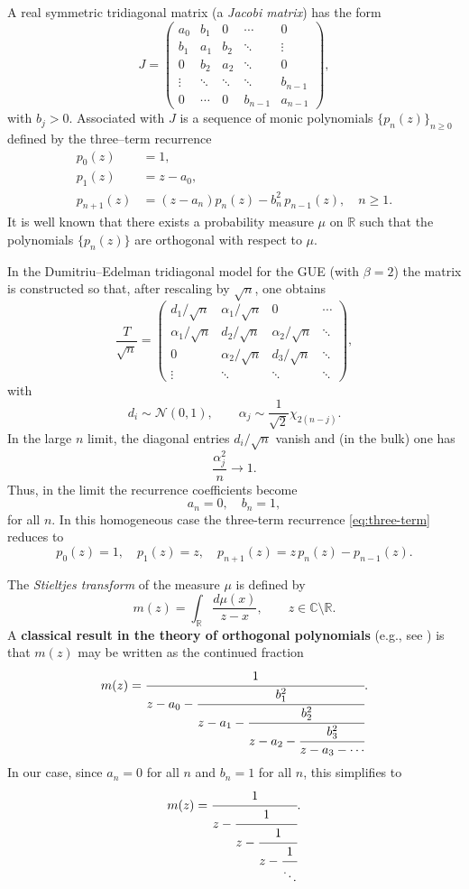 \documentclass[letterpaper,11pt,oneside,reqno]{article}
\numberwithin{equation}{section}
\theoremstyle{definition}
\begin{document}
A real symmetric tridiagonal matrix (a \emph{Jacobi matrix}) has the form
\[
J = \begin{pmatrix}
a_0 & b_1 & 0 & \cdots & 0 \\
b_1 & a_1 & b_2 & \ddots & \vdots \\
0 & b_2 & a_2 & \ddots & 0 \\
\vdots & \ddots & \ddots & \ddots & b_{n-1} \\
0 & \cdots & 0 & b_{n-1} & a_{n-1}
\end{pmatrix},
\]
with \(b_j>0\). Associated with \(J\) is a sequence of monic polynomials \(\{p_n(z)\}_{n\ge0}\) defined by the three--term recurrence
\begin{equation}\label{eq:three-term}
\begin{split}
p_0(z)&=1,\\[1mm]
p_1(z)&=z-a_0,\\[1mm]
p_{n+1}(z)&=(z-a_n)p_n(z)-b_n^2\,p_{n-1}(z),\quad n\ge1.
\end{split}
\end{equation}
It is well known that there exists a probability measure \(\mu\) on \(\mathbb{R}\) such that the polynomials \(\{p_n(z)\}\) are orthogonal with respect to \(\mu\).

\medskip

In the Dumitriu--Edelman tridiagonal model for the GUE (with \(\beta=2\)) the matrix is constructed so that, after rescaling by \(\sqrt{n}\), one obtains
\[
\frac{T}{\sqrt{n}} = \begin{pmatrix}
d_1/\sqrt{n} & \alpha_1/\sqrt{n} & 0 & \cdots\\[1mm]
\alpha_1/\sqrt{n} & d_2/\sqrt{n} & \alpha_2/\sqrt{n} & \ddots\\[1mm]
0 & \alpha_2/\sqrt{n} & d_3/\sqrt{n} & \ddots\\[1mm]
\vdots & \ddots & \ddots & \ddots
\end{pmatrix},
\]
with
\[
d_i\sim\mathcal{N}(0,1),\qquad \alpha_j\sim\frac{1}{\sqrt{2}}\chi_{2(n-j)}.
\]
In the large \(n\) limit, the diagonal entries \(d_i/\sqrt{n}\) vanish and (in the bulk) one has
\[
\frac{\alpha_j^2}{n}\to 1.
\]
Thus, in the limit the recurrence coefficients become
\[
a_n=0,\quad b_n=1,
\]
for all \(n\). In this homogeneous case the three-term recurrence \eqref{eq:three-term} reduces to
\[
p_0(z)=1,\quad p_1(z)=z,\quad p_{n+1}(z)=z\,p_n(z)-p_{n-1}(z).
\]

\medskip
The \emph{Stieltjes transform} of the measure \(\mu\) is defined by
\[
m(z)=\int_{\mathbb{R}}\frac{d\mu(x)}{z-x},\qquad z\in\mathbb{C}\setminus\mathbb{R}.
\]
A \textbf{classical result in the theory of orthogonal polynomials}
(e.g., see \cite{sokal2020euler}) 
is that \(m(z)\) may be written as the continued fraction
\begin{equation}\label{eq:CF}
m(z)=\cfrac{1}{z-a_0-\cfrac{b_1^2}{z-a_1-\cfrac{b_2^2}{z-a_2-\cfrac{b_3^2}{z-a_3-\cdots}}}}.
\end{equation}
In our case, since \(a_n=0\) for all \(n\) and \(b_n=1\) for all \(n\), this simplifies to
\begin{equation}\label{eq:CF_homogeneous}
m(z)=\cfrac{1}{z-\cfrac{1}{z-\cfrac{1}{z-\cfrac{1}{\ddots}}}}.
\end{equation}
\end{document}

